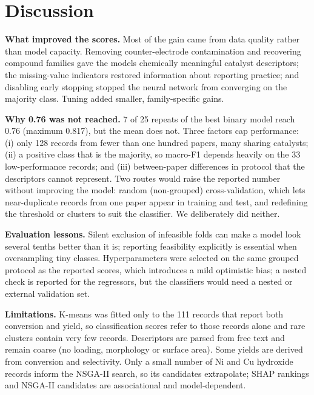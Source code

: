 \documentclass[11pt,a4paper]{article}
\begin{document}
\section{Discussion}
\textbf{What improved the scores.} Most of the gain came from data quality rather than model
capacity. Removing counter-electrode contamination and recovering compound families gave the
models chemically meaningful catalyst descriptors; the missing-value indicators restored
information about reporting practice; and disabling early stopping stopped the neural network from
converging on the majority class. Tuning added smaller, family-specific gains.

\textbf{Why 0.76 was not reached.} 7 of 25 repeats of the best binary model reach 0.76 (maximum 0.817), but the mean does not. Three factors cap performance: (i) only 128 records from fewer than one hundred papers, many sharing catalysts; (ii) a positive
class that is the majority, so macro-F1 depends heavily on the 33 low-performance records;
and (iii) between-paper differences in protocol that the descriptors cannot represent. Two
routes would raise the reported number without improving the model: random (non-grouped)
cross-validation, which lets near-duplicate records from one paper appear in training and test,
and redefining the threshold or clusters to suit the classifier. We deliberately did neither.

\textbf{Evaluation lessons.} Silent exclusion of infeasible folds can make a model look several
tenths better than it is; reporting feasibility explicitly is essential when oversampling tiny
classes. Hyperparameters were selected on the same grouped protocol as the reported scores, which
introduces a mild optimistic bias; a nested check is reported for the regressors, but the classifiers would need a nested or external validation set.

\textbf{Limitations.} K-means was fitted only to the 111 records that report both conversion and yield, so classification scores refer to those records alone and rare clusters contain very few records. Descriptors are parsed from free text and remain coarse (no loading, morphology or
surface area). Some yields are derived from conversion and selectivity. Only a small number of Ni and Cu hydroxide records inform the NSGA-II search, so its candidates extrapolate; SHAP rankings and NSGA-II candidates are associational and model-dependent.
\end{document}

